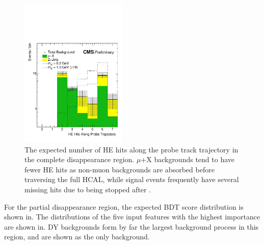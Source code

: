 \begin{figure}[htbp]
	\centering
	\includegraphics[width=0.45\textwidth]{figures/totDisappHitsOverThresh.pdf}
	\caption[Expected Complete Disappearance HE Hits]{The expected number of HE hits along the probe track trajectory in the complete disappearance region. $\mu$+X backgrounds tend to have fewer HE hits as non-muon backgrounds are absorbed before traversing the full HCAL, while signal events frequently have several missing hits due to being stopped after \dbrem.}
	\label{fig:totHitsOverThresh}
\end{figure}

For the partial disappearance region, the expected BDT score distribution is shown in. 
The distributions of the five input features with the highest importance are shown in.
DY backgrounds form by far the largest background process in this region, and are shown as the only background.

